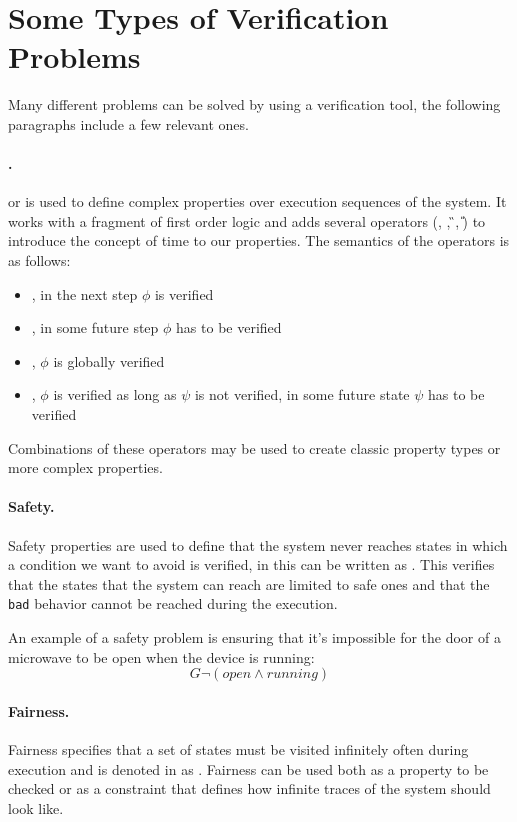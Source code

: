 \section{Some Types of Verification Problems}
Many different problems can be solved by using a verification tool, the following paragraphs include a few relevant ones.

\paragraph*{\ltl{}.} \ltl{} or \LTL{} is used to define complex properties over execution sequences of the system.
It works with a fragment of first order logic and adds several operators (\X{}, \F{}, \G{}, \U{}) to introduce the concept of time to our properties.
The semantics of the operators is as follows:
\begin{itemize}
    \item \fX{}, in the next step $\phi$ is verified
    \item \fF{}, in some future step $\phi$ has to be verified
    \item \fG{}, $\phi$ is globally verified
    \item \fU{}, $\phi$ is verified as long as $\psi$ is not verified, in some future state $\psi$ has to be verified
\end{itemize}

Combinations of these operators may be used to create classic property types or more complex properties.

\paragraph*{Safety.} Safety properties are used to define that the system never reaches states in which a condition we want to avoid is verified, in \ltl{} this can be written as \fsafe{}.
This verifies that the states that the system can reach are limited to safe ones and that the \texttt{bad} behavior cannot be reached during the execution.

An example of a safety problem is ensuring that it's impossible for the door of a microwave to be open when the device is running:
\[
    G \lnot (\mathit{open} \land \mathit{running})
\]

\paragraph*{Fairness.} Fairness specifies that a set of states must be visited infinitely often during execution and is denoted in \ltl{} as \ffair{}.
Fairness can be used both as a property to be checked or as a constraint that defines how infinite traces of the system should look like.


